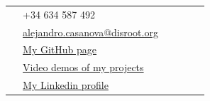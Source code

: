 \documentclass[10pt]{article} %
\begin{document}
\begin{paracol}{2}


\switchcolumn %


\parbox[top][][c]{\linewidth}{ %
	\vspace{-0.04\textheight} %
	\colorbox{shade}{ %
		\begin{supertabular}{p{0.05\linewidth}|p{0.775\linewidth}} %
			\raisebox{-1pt}{\faPhone} & +34 634 587 492 \\ %
			\raisebox{0pt}{\small\faEnvelope} & \href{mailto:alejandro.casanova@disroot.org}{alejandro.casanova@disroot.org} \\ %
			\raisebox{-1pt}{\faGithub} & \href{https://github.com/Alejandro-Casanova}{My GitHub page} \\ %
			\raisebox{-1pt}{\faYoutube} & \href{https://www.youtube.com/channel/UCwhSx1mxXiyau-KV-9Cu7OA}{Video demos of my projects} \\ %
			\raisebox{-1pt}{\faLinkedinSquare} & \href{https://www.linkedin.com/in/alejandro-casanova-mart\%C3\%ADn-b51a611ba}{My Linkedin profile} \\ %
		\end{supertabular}
	}
}


\end{paracol}
\end{document}
